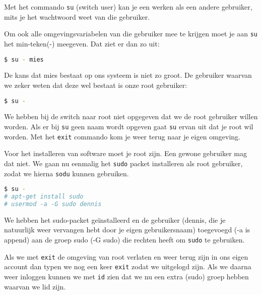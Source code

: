 Met het commando \texttt{su} (switch user) kan je een werken als een andere gebruiker, mits je het wachtwoord weet van die gebruiker.

Om ook alle omgevingsvariabelen van die gebruiker mee te krijgen moet je aan \texttt{su} het min-teken(-) meegeven. Dat ziet er dan zo uit:
\begin{lstlisting}[language=bash]
$ su - mies
\end{lstlisting}

De kans dat mies bestaat op ons systeem is niet zo groot. De gebruiker waarvan we zeker weten dat deze wel bestaat is onze root gebruiker:
\begin{lstlisting}[language=bash]
$ su -
\end{lstlisting}
We hebben bij de switch naar root niet opgegeven dat we de root gebruiker willen worden. Als er bij \texttt{su} geen naam wordt opgeven gaat \texttt{su} ervan uit dat je root wil worden. Met het \texttt{exit} commando kom je weer terug naar je eigen omgeving.

Voor het installeren van software moet je root zijn. Een gewone gebruiker mag dat niet. We gaan nu eenmalig het \texttt{sudo} packet installeren als root gebruiker, zodat we hierna \texttt{sodu} kunnen gebruiken.

\begin{lstlisting}[language=bash]
$ su -
# apt-get install sudo
# usermod -a -G sudo dennis
\end{lstlisting}
We hebben het sudo-packet ge\"installeerd en de gebruiker (dennis, die je natuurlijk weer vervangen hebt door je eigen gebruikersnaam) toegevoegd (-a is append) aan de groep sudo (-G sudo) die rechten heeft om \texttt{sudo} te gebruiken.

Als we met \texttt{exit} de omgeving van root verlaten en weer terug zijn in ons eigen account dan typen we nog een keer \texttt{exit} zodat we uitgelogd zijn. Als we daarna weer inloggen kunnen we met \texttt{id} zien dat we nu een extra (sudo) groep hebben waarvan we lid zijn.


